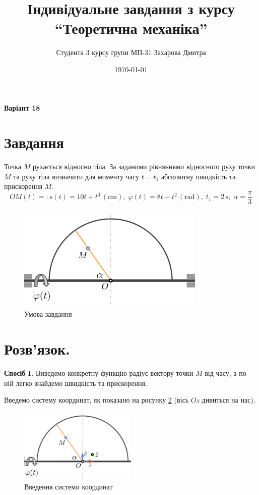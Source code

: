 \documentclass[12pt]{extarticle}
\title{Індивідуальне завдання з курсу ``Теоретична механіка''}
\author{Студента 3 курсу групи МП-31 Захарова Дмитра}
\date{\today}
\begin{document}
\maketitle

\textbf{Варіант 18}
\section*{Завдання} Точка $M$ рухається відносно тіла. За заданими рівняннями відносного руху точки $M$ та руху тіла визначити для моменту часу $t=t_1$ абсолютну швидкість та прискорення $M$.
\[
OM(t) =: s(t) = 10t+t^3 \, (\text{cm}),\;\varphi(t)=8t-t^2\, (\text{rad}),\;t_1=2 \, \text{s}, \; \alpha=\frac{\pi}{3}
\]

\begin{figure}[H]
    \centering
    \includegraphics[width=0.8\textwidth]{images/test_1/fig_1.png}
    \caption{Умова завдання}
    \label{fig:1}
\end{figure}

\pagebreak
\section*{Розв'язок.}

\textbf{Спосіб I.} Виведемо конкретну функцію радіус-вектору точки $M$ від часу, а по ній легко знайдемо швидкість та прискорення.

Введемо систему координат, як показано на рисунку \ref{fig:2} (вісь $Oz$ дивиться на нас).

\begin{figure}[H]
    \centering
    \includegraphics[width=0.5\textwidth]{images/test_1/fig_2.png}
    \caption{Введення системи координат}
    \label{fig:2}
\end{figure}
\end{document}
